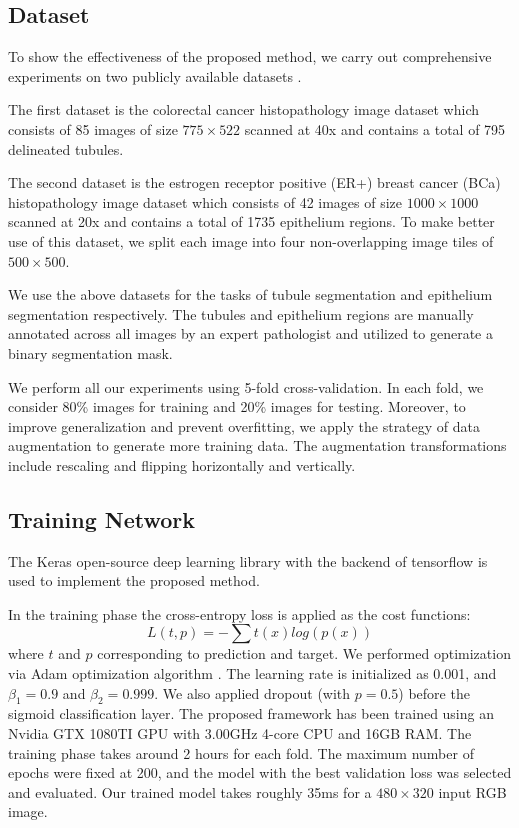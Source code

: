 \documentclass[10pt,twocolumn]{article}
\begin{document}
\subsection{Dataset} \label{s41}

To show the effectiveness of the proposed method, we carry out comprehensive experiments on two publicly available datasets \cite{r6}.

The first dataset is the colorectal cancer histopathology image dataset which consists of 85 images of size $775\times522$  scanned at 40x and contains a total of 795 delineated tubules.

The second dataset is the estrogen receptor positive (ER+) breast cancer (BCa) histopathology image dataset which consists of 42 images of size $1000\times1000$ scanned at 20x and contains a total of 1735 epithelium regions. To make better use of this dataset, we split each image into four non-overlapping image tiles of $500\times500$.

We use the above datasets for the tasks of tubule segmentation and epithelium segmentation respectively. The tubules and epithelium regions are manually annotated across all images by an expert pathologist and utilized to generate a binary segmentation mask. 

We perform all our experiments using 5-fold cross-validation. In each fold, we consider 80\% images for training and 20\% images for testing. Moreover, to improve generalization and prevent overfitting, we apply the strategy of data augmentation to generate more training data. The augmentation transformations include rescaling and flipping horizontally and vertically.
\subsection{Training Network}\label{s42}
The Keras open-source deep learning library \cite{r17} with the backend of tensorflow \cite{r18} is used to implement the proposed method.

In the training phase the cross-entropy loss is applied as the cost functions: 
  \begin{equation} 
  L(t,p)= - \sum t(x)log(p(x))
\end{equation}
where $t$ and $p$ corresponding to prediction and target.
We performed optimization via Adam optimization algorithm \cite{r19}. The learning rate is initialized as 0.001, and $\beta_{1}=0.9$ and $\beta_{2}=0.999$.
We also applied dropout \cite{r2} (with $p=0.5$) before the sigmoid classification layer.
The proposed framework has been trained using an Nvidia GTX 1080TI GPU with 3.00GHz 4-core CPU and 16GB RAM. The training phase takes around 2 hours for each fold. The maximum number of epochs were fixed at 200, and the model with the best validation loss was selected and evaluated. Our trained model takes roughly 35ms for a $480\times320$ input RGB image.
\end{document}
